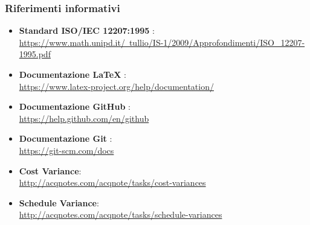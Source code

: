         \subsubsection{Riferimenti informativi}
            \begin{itemize}
                \item\textbf{Standard ISO/IEC 12207:1995} : \\
                \href{https://www.math.unipd.it/~tullio/IS-1/2009/Approfondimenti/ISO\_12207-1995.pdf}{https://www.math.unipd.it/~tullio/IS-1/2009/Approfondimenti/ISO\_12207-1995.pdf}
                \item\textbf{Documentazione LaTeX} : \\
                \href{ https://www.latex-project.org/help/documentation/}{ https://www.latex-project.org/help/documentation/}
                \item\textbf{Documentazione GitHub} : \\
                \href{ https://help.github.com/en/github}{ https://help.github.com/en/github}
                \item\textbf{Documentazione Git} : \\
                \href{ https://git-scm.com/docs}{ https://git-scm.com/docs}
                \item\textbf{Cost Variance}: \\
                \href{http://acqnotes.com/acqnote/tasks/cost-variances}{http://acqnotes.com/acqnote/tasks/cost-variances}
                \item\textbf{Schedule Variance}: \\
                \href{http://acqnotes.com/acqnote/tasks/schedule-variances}{http://acqnotes.com/acqnote/tasks/schedule-variances}
            \end{itemize}
\newpage
        
        
        
        
        
        
        
        
        
        
        
        
        
        
        
        
        
        
        
        
        
        
        